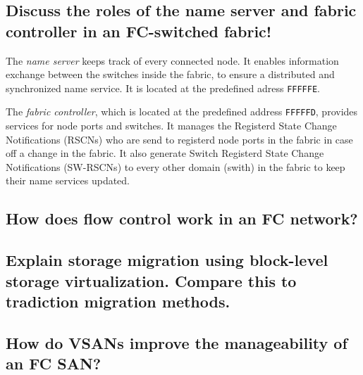 \subsection{Discuss the roles of the name server and fabric controller in an FC-switched fabric!} %
\label{sub:discuss_the_roles_of_the_name_server_and_fabric_controller_in_an_fc_switched_fabric}
	The \emph{name server} keeps track of every connected node.
	It enables information exchange between the switches inside the fabric,
	to ensure a distributed and synchronized name service.
	It is located at the predefined adress \texttt{FFFFFE}.

	The \emph{fabric controller},
	which is located at the predefined address \texttt{FFFFFD},
	provides services for node ports and switches.
	It manages the Registerd State Change Notifications (RSCNs)
	who are send to registerd node ports in the fabric
	in case off a change in the fabric.
	It also generate Switch Registerd State Change Notifications (SW-RSCNs)
	to every other domain (swith) in the fabric to
	keep their name services updated.

\subsection{How does flow control work in an FC network?} %
\label{sub:how_does_flow_control_work_in_an_fc_network}


\subsection{Explain storage migration using block-level storage virtualization. Compare this to tradiction migration methods.} %
\label{sub:explain_storage_migration_using_block_level_storage_virtualization_compare_this_to_tradiction_migration_methods_}


\subsection{How do VSANs improve the manageability of an FC SAN?} %
\label{sub:how_do_vsans_improve_the_manageability_of_an_fc_san}



